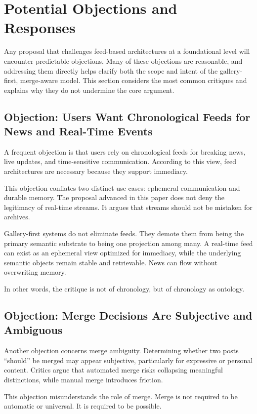 \documentclass[11pt,oneside]{article}
\begin{document}
\section{Potential Objections and Responses}

Any proposal that challenges feed-based architectures at a foundational level will encounter predictable objections. Many of these objections are reasonable, and addressing them directly helps clarify both the scope and intent of the gallery-first, merge-aware model. This section considers the most common critiques and explains why they do not undermine the core argument.

\subsection{Objection: Users Want Chronological Feeds for News and Real-Time Events}

A frequent objection is that users rely on chronological feeds for breaking news, live updates, and time-sensitive communication. According to this view, feed architectures are necessary because they support immediacy.

This objection conflates two distinct use cases: ephemeral communication and durable memory. The proposal advanced in this paper does not deny the legitimacy of real-time streams. It argues that streams should not be mistaken for archives.

Gallery-first systems do not eliminate feeds. They demote them from being the primary semantic substrate to being one projection among many. A real-time feed can exist as an ephemeral view optimized for immediacy, while the underlying semantic objects remain stable and retrievable. News can flow without overwriting memory.

In other words, the critique is not of chronology, but of chronology as ontology.

\subsection{Objection: Merge Decisions Are Subjective and Ambiguous}

Another objection concerns merge ambiguity. Determining whether two posts “should” be merged may appear subjective, particularly for expressive or personal content. Critics argue that automated merge risks collapsing meaningful distinctions, while manual merge introduces friction.

This objection misunderstands the role of merge. Merge is not required to be automatic or universal. It is required to be possible.
\end{document}
